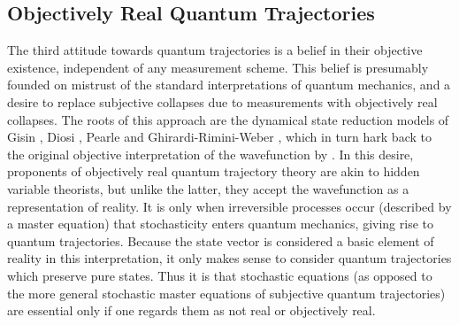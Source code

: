 \documentclass[12pt]{article}
\begin{document}
\subsection{Objectively Real Quantum Trajectories}

The third attitude towards quantum trajectories is a belief in their 
objective existence, independent of any measurement scheme. This belief 
is presumably founded on mistrust of the standard interpretations of 
quantum mechanics, and a desire to replace subjective collapses due to 
measurements with objectively real collapses. The roots of this approach 
are the dynamical state reduction models of Gisin \cite{Gis89}, 
Diosi \cite{Dio88}, Pearle \cite{Pea89} and Ghirardi-Rimini-Weber \cite{GRW},
which in turn hark back to the original objective interpretation of the 
wavefunction by \sch \cite{Roh87}. In this desire, proponents of objectively 
real quantum trajectory theory are akin to hidden variable theorists, but 
unlike the latter, they accept the wavefunction as a 
representation of reality. It is only when irreversible processes occur 
(described by a master equation) that stochasticity enters quantum 
mechanics, giving rise to quantum trajectories. Because the state vector is considered
a basic element of reality in this  interpretation, it only makes sense to consider
quantum trajectories  which preserve pure states. Thus it is that stochastic \sch
equations (as opposed to the more general stochastic master equations of subjective
quantum trajectories) are essential only if one regards them as not real or
objectively  real.
\end{document}
